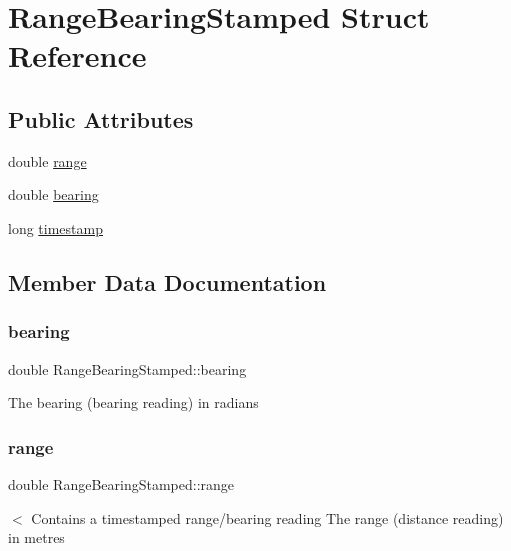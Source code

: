 \hypertarget{structRangeBearingStamped}{}\section{Range\+Bearing\+Stamped Struct Reference}
\label{structRangeBearingStamped}
\subsection*{Public Attributes}
\begin{DoxyCompactItemize}
\item 
double \hyperlink{structRangeBearingStamped_af49767ebfdc4e481cab3ec2453f83884}{range}
\item 
double \hyperlink{structRangeBearingStamped_a7fffdf2e1776060acadc87083740a1da}{bearing}
\item 
long \hyperlink{structRangeBearingStamped_a7803974f4f1e9de3469b21dae3289530}{timestamp}
\end{DoxyCompactItemize}


\subsection{Member Data Documentation}
\mbox{\label{structRangeBearingStamped_a7fffdf2e1776060acadc87083740a1da}} 
\subsubsection{\texorpdfstring{bearing}{bearing}}
{\footnotesize\ttfamily double Range\+Bearing\+Stamped\+::bearing}

The bearing (bearing reading) in radians \mbox{\label{structRangeBearingStamped_af49767ebfdc4e481cab3ec2453f83884}} 
\subsubsection{\texorpdfstring{range}{range}}
{\footnotesize\ttfamily double Range\+Bearing\+Stamped\+::range}

$<$ Contains a timestamped range/bearing reading The range (distance reading) in metres \mbox{\label{structRangeBearingStamped_a7803974f4f1e9de3469b21dae3289530}} 
